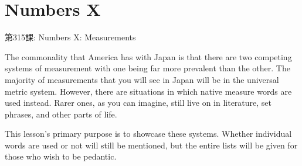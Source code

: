     
\chapter{Numbers X}

\begin{center}
\begin{Large}
第315課: Numbers X: Measurements 
\end{Large}
\end{center}
 
\par{ The commonality that America has with Japan is that there are two competing systems of measurement with one being far more prevalent than the other. The majority of measurements that you will see in Japan will be in the universal metric system. However, there are situations in which native measure words are used instead. Rarer ones, as you can imagine, still live on in literature, set phrases, and other parts of life. }

\par{ This lesson's primary purpose is to showcase these systems. Whether individual words are used or not will still be mentioned, but the entire lists will be given for those who wish to be pedantic.  }
      
